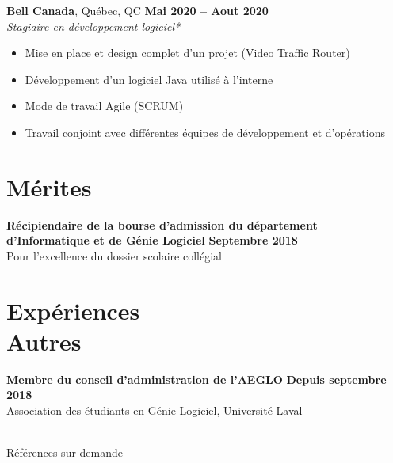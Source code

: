 \documentclass[margin,line]{resume}
\begin{document}
\begin{resume}
    \textbf{Bell Canada}, Québec, QC \hfill \textbf{Mai 2020 -- Aout 2020} \vspace{2mm}\\\vspace{1mm}%
    \textsl{Stagiaire en développement logiciel*}
    \begin{itemize}[nosep]
        \item Mise en place et design complet d'un projet (Video Traffic Router)
        \item Développement d'un logiciel Java utilisé à l'interne
        \item Mode de travail Agile (SCRUM)
        \item Travail conjoint avec différentes équipes de développement et d'opérations
    \end{itemize}  
       
    \section{\mysidestyle Mérites} 
     \textbf{Récipiendaire de la bourse d'admission du département
     \\      d'Informatique et de Génie Logiciel} \hfill \textbf{Septembre 2018}
     \vspace{2mm}\\\vspace{1mm}
        Pour l'excellence du dossier scolaire collégial
 
    \section{\mysidestyle Expériences\\Autres}
     \textbf{Membre du conseil d'administration de l'AEGLO} \hfill \textbf{Depuis septembre 2018} \vspace{2mm}\\\vspace{1mm}
    Association des étudiants en Génie Logiciel, Université Laval \\ \\
      

\end{resume}

\name{}
\begin{resume}
\hfill *Références sur demande
\end{resume}
\end{document}
